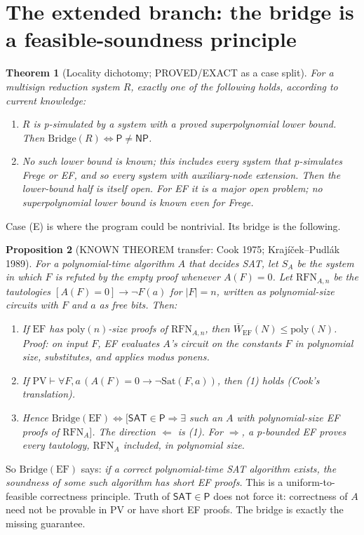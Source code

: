 \documentclass[11pt]{article}
\newtheorem{theorem}{Theorem}
\newtheorem{proposition}[theorem]{Proposition}
\newcommand{\SAT}{\mathsf{SAT}}
\newcommand{\Pc}{\mathsf{P}}
\newcommand{\NP}{\mathsf{NP}}
\newcommand{\Wb}{\overline W}
\begin{document}
\section{The extended branch: the bridge is a feasible-soundness principle}
\begin{theorem}[Locality dichotomy; PROVED/EXACT as a case split]\label{thm:dichotomy}
For a multisign reduction system $R$, exactly one of the following holds, according to current knowledge:
\begin{enumerate}
\item[(L)] $R$ is p-simulated by a system with a proved superpolynomial lower bound. Then $\mathrm{Bridge}(R)\iff\Pc\ne\NP$.
\item[(E)] No such lower bound is known; this includes every system that p-simulates Frege or EF, and so every system with auxiliary-node extension. Then the lower-bound half is itself open. For EF it is a major open problem; no superpolynomial lower bound is known even for Frege.
\end{enumerate}
\end{theorem}
Case (E) is where the program could be nontrivial. Its bridge is the following.

\begin{proposition}[KNOWN THEOREM transfer: Cook 1975; Krajíček--Pudlák 1989]\label{prop:refl}
For a polynomial-time algorithm $A$ that decides SAT, let $S_A$ be the system in which $F$
is refuted by the empty proof whenever $A(F)=0$. Let $\mathrm{RFN}_{A,n}$
be the tautologies $[A(F)=0]\to\neg F(a)$ for $|F|=n$, written as polynomial-size
circuits with $F$ and $a$ as free bits. Then:
\begin{enumerate}
\item If $\mathrm{EF}$ has $\mathrm{poly}(n)$-size proofs of $\mathrm{RFN}_{A,n}$, then $\Wb_{\mathrm{EF}}(N)\le\mathrm{poly}(N)$.
    Proof: on input $F$, EF evaluates $A$'s circuit on the constants $F$ in polynomial size, substitutes, and applies modus ponens.
\item If $\mathrm{PV}\vdash\forall F,a\,(A(F)=0\to\neg\mathrm{Sat}(F,a))$, then (1) holds (Cook's translation).
\item Hence $\mathrm{Bridge}(\mathrm{EF})\iff\big[\SAT\in\Pc\Rightarrow\exists$ such an $A$ with polynomial-size EF proofs of $\mathrm{RFN}_{A}\big]$.
The direction $\Leftarrow$ is (1). For $\Rightarrow$, a p-bounded EF proves every tautology, $\mathrm{RFN}_A$ included, in polynomial size.
\end{enumerate}
\end{proposition}
So $\mathrm{Bridge}(\mathrm{EF})$ says: \emph{if a correct polynomial-time SAT algorithm
exists, the soundness of some such algorithm has short EF proofs.} This is a
uniform-to-feasible correctness principle. Truth of $\SAT\in\Pc$ does not
force it: correctness of $A$ need not be provable in PV or have short EF proofs.
The bridge is exactly the missing guarantee.
\end{document}
